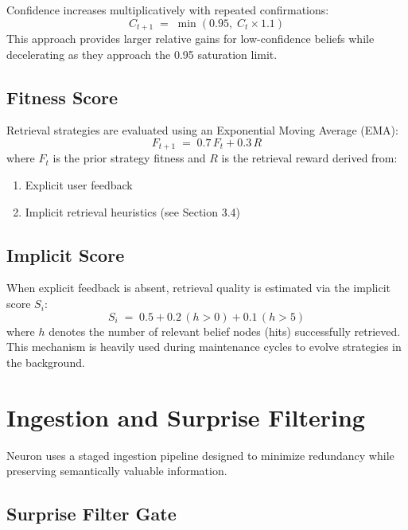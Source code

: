 \documentclass[11pt,a4paper]{article}
\begin{document}
Confidence increases multiplicatively with repeated confirmations:
\[
    C_{t+1} \;=\; \min(0.95,\;C_t \times 1.1)
\]
This approach provides larger relative gains for low-confidence beliefs while decelerating as they approach the 0.95 saturation limit.

\subsection{Fitness Score}

Retrieval strategies are evaluated using an Exponential Moving Average (EMA):
\[
    F_{t+1} \;=\; 0.7\,F_t + 0.3\,R
\]
where $F_t$ is the prior strategy fitness and $R$ is the retrieval reward derived from:

\begin{enumerate}
    \item Explicit user feedback
    \item Implicit retrieval heuristics (see Section 3.4)
\end{enumerate}

\subsection{Implicit Score}

When explicit feedback is absent, retrieval quality is estimated via the implicit score $S_i$:
\[
    S_i \;=\; 0.5 + 0.2\,(h>0) + 0.1\,(h>5)
\]
where $h$ denotes the number of relevant belief nodes (hits) successfully retrieved. This mechanism is heavily used during maintenance cycles to evolve strategies in the background.

\section{Ingestion and Surprise Filtering}

Neuron uses a staged ingestion pipeline designed to minimize redundancy while
preserving semantically valuable information.

\subsection{Surprise Filter Gate}
\end{document}
